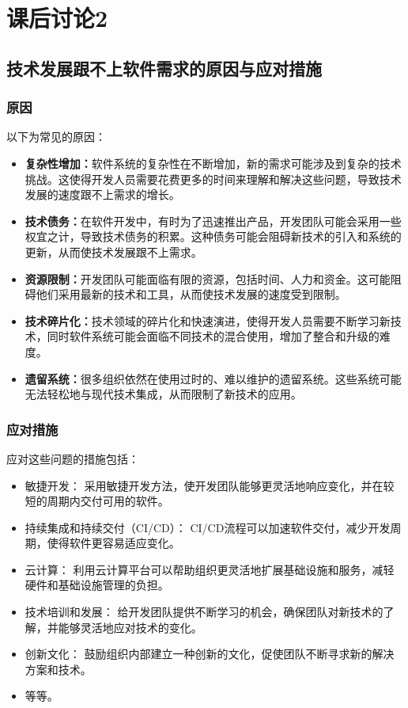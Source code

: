 \documentclass[11pt, a4paper, oneside]{ctexbook}
\begin{document}
\chapter{课后讨论2}
\section{技术发展跟不上软件需求的原因与应对措施}
\subsection{原因}
以下为常见的原因：
\begin{itemize}
    \item \textbf{复杂性增加：}软件系统的复杂性在不断增加，新的需求可能涉及到复杂的技术挑战。这使得开发人员需要花费更多的时间来理解和解决这些问题，导致技术发展的速度跟不上需求的增长。
    \item \textbf{技术债务：}在软件开发中，有时为了迅速推出产品，开发团队可能会采用一些权宜之计，导致技术债务的积累。这种债务可能会阻碍新技术的引入和系统的更新，从而使技术发展跟不上需求。
    \item \textbf{资源限制：}开发团队可能面临有限的资源，包括时间、人力和资金。这可能阻碍他们采用最新的技术和工具，从而使技术发展的速度受到限制。
    \item \textbf{技术碎片化：}技术领域的碎片化和快速演进，使得开发人员需要不断学习新技术，同时软件系统可能会面临不同技术的混合使用，增加了整合和升级的难度。
    \item \textbf{遗留系统：}很多组织依然在使用过时的、难以维护的遗留系统。这些系统可能无法轻松地与现代技术集成，从而限制了新技术的应用。
\end{itemize}
\subsection{应对措施}
应对这些问题的措施包括：
\begin{itemize}
    \item 敏捷开发： 采用敏捷开发方法，使开发团队能够更灵活地响应变化，并在较短的周期内交付可用的软件。
    \item 持续集成和持续交付（CI/CD）： CI/CD流程可以加速软件交付，减少开发周期，使得软件更容易适应变化。
    \item 云计算： 利用云计算平台可以帮助组织更灵活地扩展基础设施和服务，减轻硬件和基础设施管理的负担。
    \item 技术培训和发展： 给开发团队提供不断学习的机会，确保团队对新技术的了解，并能够灵活地应对技术的变化。
    \item 创新文化： 鼓励组织内部建立一种创新的文化，促使团队不断寻求新的解决方案和技术。
    \item 等等。
\end{itemize}
\end{document}

